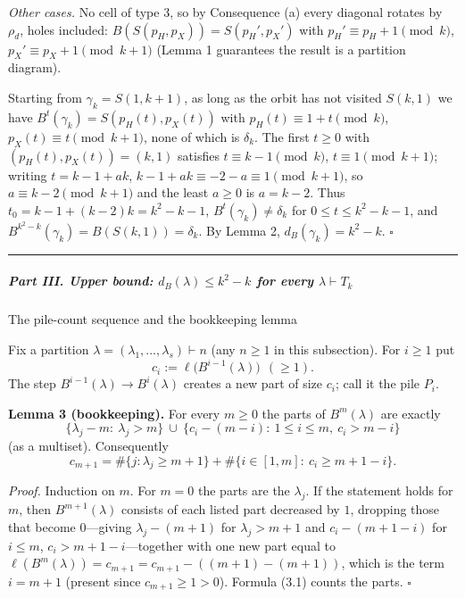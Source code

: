 \emph{Other cases.} No cell of type 3, so by Consequence (a) every
diagonal rotates by \(\rho_d\), holes included:
\(B(S(p_H,p_X))=S(p_H',p_X')\) with \(p_H'\equiv p_H+1\pmod k\),
\(p_X'\equiv p_X+1\pmod{k+1}\) (Lemma 1 guarantees the result is a
partition diagram).

Starting from \(\gamma_k=S(1,k+1)\), as long as the orbit has not
visited \(S(k,1)\) we have \(B^t(\gamma_k)=S(p_H(t),p_X(t))\) with
\(p_H(t)\equiv1+t\pmod k\), \(p_X(t)\equiv t\pmod{k+1}\), none of which
is \(\delta_k\). The first \(t\ge0\) with \((p_H(t),p_X(t))=(k,1)\)
satisfies \(t\equiv k-1\pmod k\), \(t\equiv1\pmod{k+1}\); writing
\(t=k-1+ak\), \(k-1+ak\equiv-2-a\equiv1\pmod{k+1}\), so
\(a\equiv k-2\pmod{k+1}\) and the least \(a\ge0\) is \(a=k-2\). Thus
\(t_0=k-1+(k-2)k=k^2-k-1\), \(B^t(\gamma_k)\ne\delta_k\) for
\(0\le t\le k^2-k-1\), and \(B^{k^2-k}(\gamma_k)=B(S(k,1))=\delta_k\).
By Lemma 2, \(d_B(\gamma_k)=k^2-k\). \(\square\)

\begin{center}\rule{0.5\linewidth}{0.5pt}\end{center}

\subparagraph{\texorpdfstring{Part III. Upper bound:
\(d_B(\lambda)\le k^2-k\) for every
\(\lambda\vdash T_k\)}{Part III. Upper bound: d\_B(\textbackslash lambda)\textbackslash le k\^{}2-k for every \textbackslash lambda\textbackslash vdash T\_k}}\label{part-iii.-upper-bound-d_blambdale-k2-k-for-every-lambdavdash-t_k}

The pile-count sequence and the bookkeeping lemma

Fix a partition \(\lambda=(\lambda_1,\dots,\lambda_s)\vdash n\) (any
\(n\ge1\) in this subsection). For \(i\ge1\) put
\[c_i:=\ell\big(B^{i-1}(\lambda)\big)\ \ (\ge1).\] The step
\(B^{i-1}(\lambda)\to B^{i}(\lambda)\) creates a new part of size
\(c_i\); call it the pile \(P_i\).

\textbf{Lemma 3 (bookkeeping).} For every \(m\ge0\) the parts of
\(B^m(\lambda)\) are exactly
\[\{\lambda_j-m:\ \lambda_j>m\}\ \cup\ \{c_i-(m-i):\ 1\le i\le m,\ c_i>m-i\}\]
(as a multiset). Consequently
\[c_{m+1}=\#\{j:\lambda_j\ge m+1\}+\#\{i\in[1,m]:\ c_i\ge m+1-i\}.\tag{3.1}\]

\emph{Proof.} Induction on \(m\). For \(m=0\) the parts are the
\(\lambda_j\). If the statement holds for \(m\), then
\(B^{m+1}(\lambda)\) consists of each listed part decreased by \(1\),
dropping those that become \(0\)---giving \(\lambda_j-(m+1)\) for
\(\lambda_j>m+1\) and \(c_i-(m+1-i)\) for \(i\le m\),
\(c_i>m+1-i\)---together with one new part equal to
\(\ell(B^m(\lambda))=c_{m+1}=c_{m+1}-((m+1)-(m+1))\), which is the term
\(i=m+1\) (present since \(c_{m+1}\ge1>0\)). Formula (3.1) counts the
parts. \(\square\)

